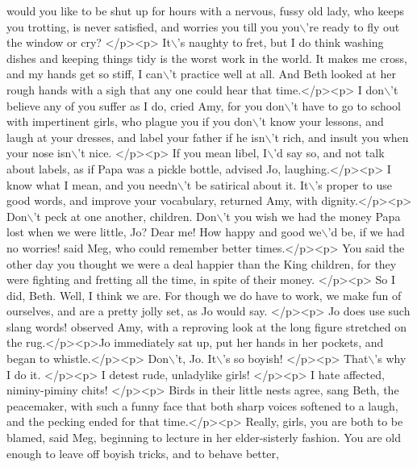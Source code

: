 \begin{DoxyCode}
{       would you like to be shut up for hours with a nervous, fussy old lady, who keeps you trotting, is never
       satisfied, and worries you till you you\(\backslash\)'re ready to fly out the window or cry? </p><p> It\(\backslash\)'s naughty to fret, but
       I do think washing dishes and keeping things tidy is the worst work in the world.  It makes me cross, and
       my hands get so stiff, I can\(\backslash\)'t practice well at all.  And Beth looked at her rough hands with a sigh that
       any one could hear that time.</p><p> I don\(\backslash\)'t believe any of you suffer as I do,  cried Amy,  for you don\(\backslash\)'t
       have to go to school with impertinent girls, who plague you if you don\(\backslash\)'t know your lessons, and laugh at
       your dresses, and label your father if he isn\(\backslash\)'t rich, and insult you when your nose isn\(\backslash\)'t nice. </p><p> If
       you mean libel, I\(\backslash\)'d say so, and not talk about labels, as if Papa was a pickle bottle,  advised Jo,
       laughing.</p><p> I know what I mean, and you needn\(\backslash\)'t be satirical about it. It\(\backslash\)'s proper to use good words, and
       improve your vocabulary,  returned Amy, with dignity.</p><p> Don\(\backslash\)'t peck at one another, children. Don\(\backslash\)'t you
       wish we had the money Papa lost when we were little, Jo? Dear me! How happy and good we\(\backslash\)'d be, if we had no
       worries!  said Meg, who could remember better times.</p><p> You said the other day you thought we were a deal
       happier than the King children, for they were fighting and fretting all the time, in spite of their money.
       </p><p> So I did, Beth. Well, I think we are. For though we do have to work, we make fun of ourselves, and
       are a pretty jolly set, as Jo would say. </p><p> Jo does use such slang words!   observed Amy, with a
       reproving look at the long figure stretched on the rug.</p><p>Jo immediately sat up, put her hands in her pockets,
       and began to whistle.</p><p> Don\(\backslash\)'t, Jo. It\(\backslash\)'s so boyish! </p><p> That\(\backslash\)'s why I do it. </p><p> I detest rude,
       unladylike girls! </p><p> I hate affected, niminy-piminy chits! </p><p> Birds in their little nests agree, 
       sang Beth, the peacemaker, with such a funny face that both sharp voices softened to a laugh, and the 
       pecking  ended for that time.</p><p> Really, girls, you are both to be blamed,  said Meg, beginning to lecture
       in her elder-sisterly fashion. You are old enough to leave off boyish tricks, and to behave better,
}
\end{DoxyCode}
